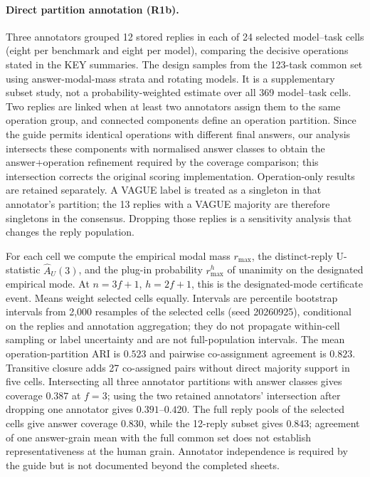 \paragraph{Direct partition annotation (R1b).}
Three annotators grouped 12 stored replies in each of 24 selected model--task cells
(eight per benchmark and eight per model), comparing the decisive operations stated
in the KEY summaries. The design samples from the 123-task common set using
answer-modal-mass strata and rotating models. It is a supplementary subset study,
not a probability-weighted estimate over all 369 model--task cells.
Two replies are linked when at least two annotators assign them to the same operation
group, and connected components define an operation partition. Since the guide permits
identical operations with different final answers, our analysis intersects these
components with normalised answer classes to obtain the answer+operation refinement
required by the coverage comparison; this intersection corrects the original scoring
implementation. Operation-only results are retained separately.
A VAGUE label is treated as a singleton in that annotator's partition; the 13 replies
with a VAGUE majority are therefore singletons in the consensus. Dropping those replies
is a sensitivity analysis that changes the reply population.

For each cell we compute the empirical modal mass $r_{\max}$, the distinct-reply
U-statistic $\widehat A_U(3)$, and the plug-in probability $r_{\max}^{h}$ of unanimity
on the designated empirical mode. At $n=3f+1$, $h=2f+1$, this is the designated-mode
certificate event. Means weight selected cells equally. Intervals are percentile
bootstrap intervals from 2,000 resamples of the selected cells (seed 20260925),
conditional on the replies and annotation aggregation; they do not propagate
within-cell sampling or label uncertainty and are not full-population intervals.
The mean operation-partition ARI is $0.523$ and pairwise co-assignment agreement is
$0.823$. Transitive closure adds 27 co-assigned pairs without direct majority support
in five cells. Intersecting all three annotator partitions with answer classes gives
coverage $0.387$ at $f=3$; using the two retained annotators' intersection after dropping
one annotator gives $0.391$--$0.420$.
The full reply pools of the selected cells give answer coverage $0.830$, while the
12-reply subset gives $0.843$; agreement of one answer-grain mean with the full common
set does not establish representativeness at the human grain. Annotator independence
is required by the guide but is not documented beyond the completed sheets.

